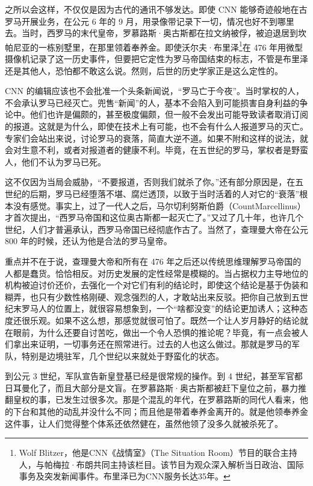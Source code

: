 之所以会这样，不仅仅是因为古代的通讯不够发达。即使 CNN 能够奇迹般地在古罗马开展业务，在公元 6 年的 9 月，用录像带记录下一切，情况也好不到哪里去。当时，西罗马的末代皇帝，罗慕路斯·奥古斯都在拉文纳被俘，被迫退居到坎帕尼亚的一栋别墅里，在那里领着奉养金。即使沃尔夫·布里泽\footnote{Wolf Blitzer，他是CNN《战情室》（The Situation Room）节目的联合主持人，与帕梅拉·布朗共同主持该栏目。该节目为观众深入解析当日政治、国际事务及突发新闻事件。布里泽已为CNN服务长达35年。}在 476 年用微型摄像机记录了这一历史事件，但要把它定性为罗马帝国结束的标志，不管是布里泽还是其他人，恐怕都不敢这么说。然则，后世的历史学家正是这么定性的。

CNN 的编辑应该也不会批准一个头条新闻说，“罗马亡于今夜”。当时掌权的人，不会承认罗马已经灭亡。兜售“新闻”的人，基本不会陷入到可能损害自身利益的争论中。他们也许是偏颇的，甚至极度偏颇，但一般不会发出可能导致读者取消订阅的报道。这就是为什么，即使在技术上有可能，也不会有什么人报道罗马的灭亡。专家们会站出来说，讨论罗马的衰落，简直大逆不道。如果不附和这样的说法，就会对生意不利，或者对报道者的健康不利。毕竟，在五世纪的罗马，掌权者是野蛮人，他们不认为罗马已死。

这不仅因为当局会威胁，“不要报道，否则我们就杀了你。”还有部分原因是，在五世纪的后期，罗马已经堕落不堪、腐烂透顶，以致于当时活着的人对它的“衰落”根本没有感觉。事实上，过了一代人之后，马尔切利努斯伯爵（CountMarcellinus）才首次提出，“西罗马帝国和这位奥古斯都一起灭亡了。”又过了几十年，也许几个世纪，人们才普遍承认，西罗马帝国已经彻底作古了。当然了，查理曼大帝在公元 800 年的时候，还认为他是合法的罗马皇帝。

重点并不在于说，查理曼大帝和所有在 476 年之后还以传统思维理解罗马帝国的人都是蠢货。恰恰相反。对历史发展的定性经常是模糊的。当占据权力主导地位的机构被迫讨价还价，去强化一个对它们有利的结论时，即使这个结论是基于伪装和糊弄，也只有少数性格刚硬、观念强烈的人，才敢站出来反驳。把你自己放到五世纪末罗马人的位置上，就很容易想象到，一个“啥都没变”的结论更加诱人；这种态度还很乐观。如果不这么想，那感觉就很可怕了。既然一个让人岁月静好的结论就在眼前，为什么还要自讨苦吃，做出一个令人恐惧的推论呢？毕竟，有一点会被人们拿出来证明，一切事务还在照常进行。过去的人也这么做过。那就是罗马的军队，特别是边境驻军，几个世纪以来就处于野蛮化的状态。

到公元 3 世纪，军队宣告新皇登基已经是很常规的操作。到 4 世纪，甚至军官都日耳曼化了，而且大部分是文盲。在罗慕路斯·奥古斯都被赶下皇位之前，暴力推翻皇权的事，已发生过很多次。那是个混乱的年代，在罗慕路斯的同代人看来，他的下台和其他的动乱并没什么不同；而且他是带着奉养金离开的。就是他领奉养金这件事，让人们觉得整个体系还依然健在，虽然他领了没多久就被杀死了。

